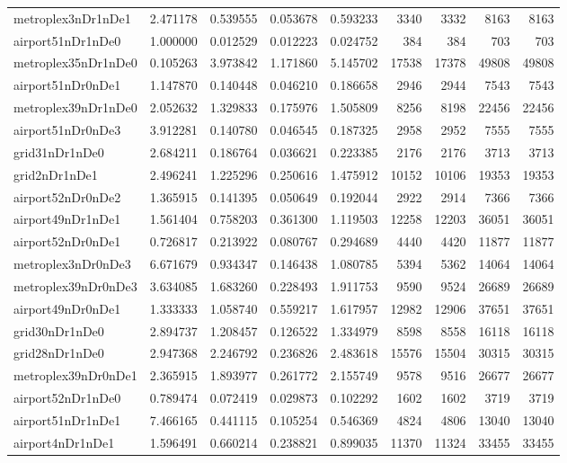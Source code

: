 \begin{longtable}{|l|r|r|r|r|r|r|r|r|}
metroplex3nDr1nDe1 & 2.471178 & 0.539555 & 0.053678 & 0.593233 & 3340 & 3332 & 8163 & 8163 \\
airport51nDr1nDe0 & 1.000000 & 0.012529 & 0.012223 & 0.024752 & 384 & 384 & 703 & 703 \\
metroplex35nDr1nDe0 & 0.105263 & 3.973842 & 1.171860 & 5.145702 & 17538 & 17378 & 49808 & 49808 \\
airport51nDr0nDe1 & 1.147870 & 0.140448 & 0.046210 & 0.186658 & 2946 & 2944 & 7543 & 7543 \\
metroplex39nDr1nDe0 & 2.052632 & 1.329833 & 0.175976 & 1.505809 & 8256 & 8198 & 22456 & 22456 \\
airport51nDr0nDe3 & 3.912281 & 0.140780 & 0.046545 & 0.187325 & 2958 & 2952 & 7555 & 7555 \\
grid31nDr1nDe0 & 2.684211 & 0.186764 & 0.036621 & 0.223385 & 2176 & 2176 & 3713 & 3713 \\
grid2nDr1nDe1 & 2.496241 & 1.225296 & 0.250616 & 1.475912 & 10152 & 10106 & 19353 & 19353 \\
airport52nDr0nDe2 & 1.365915 & 0.141395 & 0.050649 & 0.192044 & 2922 & 2914 & 7366 & 7366 \\
airport49nDr1nDe1 & 1.561404 & 0.758203 & 0.361300 & 1.119503 & 12258 & 12203 & 36051 & 36051 \\
airport52nDr0nDe1 & 0.726817 & 0.213922 & 0.080767 & 0.294689 & 4440 & 4420 & 11877 & 11877 \\
metroplex3nDr0nDe3 & 6.671679 & 0.934347 & 0.146438 & 1.080785 & 5394 & 5362 & 14064 & 14064 \\
metroplex39nDr0nDe3 & 3.634085 & 1.683260 & 0.228493 & 1.911753 & 9590 & 9524 & 26689 & 26689 \\
airport49nDr0nDe1 & 1.333333 & 1.058740 & 0.559217 & 1.617957 & 12982 & 12906 & 37651 & 37651 \\
grid30nDr1nDe0 & 2.894737 & 1.208457 & 0.126522 & 1.334979 & 8598 & 8558 & 16118 & 16118 \\
grid28nDr1nDe0 & 2.947368 & 2.246792 & 0.236826 & 2.483618 & 15576 & 15504 & 30315 & 30315 \\
metroplex39nDr0nDe1 & 2.365915 & 1.893977 & 0.261772 & 2.155749 & 9578 & 9516 & 26677 & 26677 \\
airport52nDr1nDe0 & 0.789474 & 0.072419 & 0.029873 & 0.102292 & 1602 & 1602 & 3719 & 3719 \\
airport51nDr1nDe1 & 7.466165 & 0.441115 & 0.105254 & 0.546369 & 4824 & 4806 & 13040 & 13040 \\
airport4nDr1nDe1 & 1.596491 & 0.660214 & 0.238821 & 0.899035 & 11370 & 11324 & 33455 & 33455 \\

\end{longtable}
